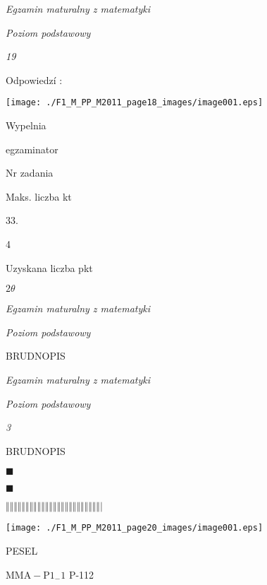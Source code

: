 \documentclass[a4paper,12pt]{article}
\begin{document}
{\it Egzamin maturalny z matematyki}

{\it Poziom podstawowy}

{\it 19}

Odpowiedzí :
\begin{center}
\texttt{[image: ./F1\_M\_PP\_M2011\_page18\_images/image001.eps]}
\end{center}
Wypelnia

egzaminator

Nr zadania

Maks. liczba kt

33.

4

Uzyskana liczba pkt





$ 2\theta$

{\it Egzamin maturalny z matematyki}

{\it Poziom podstawowy}

BRUDNOPIS





{\it Egzamin maturalny z matematyki}

{\it Poziom podstawowy}

{\it 3}

BRUDNOPIS





$\blacksquare$

$\blacksquare$

$\Vert\Vert\Vert\Vert\Vert\Vert\Vert\Vert\Vert\Vert\Vert\Vert\Vert\Vert\Vert\Vert\Vert\Vert\Vert\Vert\Vert\Vert\Vert\Vert|$
\begin{center}
\texttt{[image: ./F1\_M\_PP\_M2011\_page20\_images/image001.eps]}
\end{center}
PESEL

$\mathrm{M}\mathrm{M}\mathrm{A}-\mathrm{P}1_{-}1$ P-112
\end{document}
